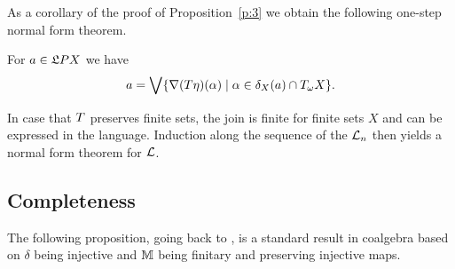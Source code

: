 \documentclass{book}
\begin{document}
As a corollary of the proof of Proposition~\ref{p:3} we obtain the
following one-step normal form theorem.

\begin{corollary}
For $a\in\mathfrak{L}P X$ we have 
\[ a=\bigvee\{\nabla(T \eta)(\alpha)
\mid\alpha\in\delta_X(a) \cap T_{\omega} X\}.\]
\end{corollary}

\noindent In case that $T$ preserves finite sets, the join is finite
for finite sets $X$ and can be expressed in the language.  Induction
along the sequence of the $\mathcal{L}_n$ then yields a normal form theorem
for $\mathcal{L}$.

\subsection{Completeness}

The following proposition, going back to \cite{kkp:cmcs04}, is a
standard result in coalgebra based on $\delta$ being injective and
$\mathbb{M}$ being finitary and preserving injective maps.
\end{document}
